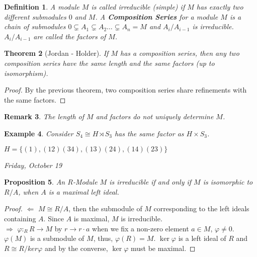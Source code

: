 \documentclass[letterpaper, leqno, 12pt]{article}
\newcommand{\fin}{\qquad \quad \hfill \framebox[1.75mm][l]{\,}}
\theoremstyle{stdthm}
\newtheorem{thm}{Theorem}
\newtheorem{prop}[thm]{Proposition}
\theoremstyle{stddef}
\newtheorem{defn}[thm]{Definition}
\newtheorem{rem}[thm]{Remark} %
\newtheorem{eg}[thm]{Example} %
\theoremstyle{stdnonum}
\theoremstyle{stdqands}
\theoremstyle{stdbold}
\begin{document}
\begin{defn}
A module $M$ is called irreducible (simple) if $M$ has exactly two different submodules $0$ and $M$. A {\bf Composition Series} for a module $M$ is a chain of submodules $0 \subsetneq A_1 \subsetneq A_2 \dots \subsetneq A_n = M$ and $A_i / A_{i-1}$ is irreducible.  $A_i/A_{i-1}$ are called the factors of $M$. 
\end{defn}

\begin{thm} [Jordan - Holder]
If $M$ has a composition series, then any two composition series have the same length and the same factors (up to isomorphism). 
\end{thm}

\begin{proof}
By the previous theorem, two composition series share refinements with the same factors. 
\end{proof}

\begin{rem}
The length of $M$ and factors do not uniquely determine $M$. 
\end{rem}

\begin{eg}
Consider $S_4 \cong H \rtimes S_3$ has the same factor as $H \times S_3$. 

\noindent $H = \{ (1),(12)(34), (13)(24), (14)(23)\}$ 
\end{eg}

\begin{center}
\emph{Friday, October 19}
\end{center}

\begin{prop}
An $R$-Module $M$ is irreducible if and only if $M$ is isomorphic to $R/A$, when $A$ is a maximal left ideal. 
\end{prop}

\begin{proof}
$\Leftarrow$ $M\cong R/A$, then the submodule of $M$ corresponding to the left ideals containing $A$. Since $A$ is maximal, $M$ is irreducible. \\

$\Rightarrow$ $\varphi: _RR\rightarrow M$ by $r \rightarrow r\cdot a$ when we fix a non-zero element $a \in M$, $\varphi \neq 0$. $\varphi(M)$ is a submodule of $M$, thus, $\varphi(R) = M$. $\ker \varphi$ is a left ideal of $R$ and $R \cong R/ker \varphi$ and by the converse, $\ker \varphi$ must be maximal. 
\end{proof}
\end{document}
